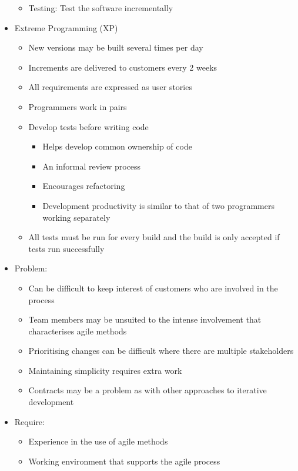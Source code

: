 \documentclass[12pt,openany]{book}
\begin{document}
\begin{itemize}
\begin{itemize}
        \item Testing: Test the software incrementally
    \end{itemize}
    \item Extreme Programming (XP)
    \begin{itemize}
        \item New versions may be built several times per day
        \item Increments are delivered to customers every 2 weeks
        \item All requirements are expressed as user stories
        \item Programmers work in pairs
        \item Develop tests before writing code
        \begin{itemize}
            \item Helps develop common ownership of code
            \item An informal review process
            \item Encourages refactoring
            \item Development productivity is similar to that of two programmers working separately
        \end{itemize}
        \item All tests must be run for every build and the build is only accepted if tests run successfully
    \end{itemize}
    \item Problem:
    \begin{itemize}
        \item Can be difficult to keep interest of customers who are involved in the process
        \item Team members may be unsuited to the intense involvement that characterises agile methods
        \item Prioritising changes can be difficult where there are multiple stakeholders
        \item Maintaining simplicity requires extra work
        \item Contracts may be a problem as with other approaches to iterative development
    \end{itemize}
    \item Require:
    \begin{itemize}
        \item Experience in the use of agile methods
        \item Working environment that supports the agile process

\end{itemize}
\end{itemize}
\end{document}
